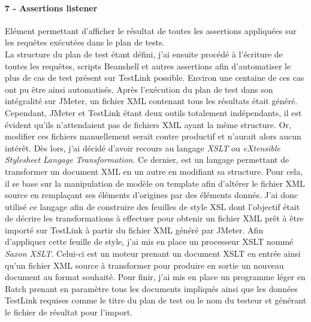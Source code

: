 	\paragraph{7 - Assertions listener}
	Elément permettant d'afficher le résultat de toutes les assertions appliquées sur les requêtes exécutées dans le plan de tests. \\
	
	La structure du plan de test étant défini, j'ai ensuite procédé à l'écriture de toutes les requêtes, scripts Beanshell et autres assertions afin d'automatiser le plus de cas de test présent sur TestLink possible. Environ une centaine de ces cas ont pu être ainsi automatisés. Après l'exécution du plan de test dans son intégralité sur JMeter, un fichier XML contenant tous les résultats était généré. \\
	
	 Cependant, JMeter et TestLink étant deux outils totalement indépendants, il est évident qu'ils n'attendaient pas de fichiers XML ayant la même structure. Or, modifier ces fichiers manuellement serait contre productif et n'aurait alors aucun intérêt. Dès lors, j'ai décidé d'avoir recours au langage \textit{XSLT} ou \textit{eXtensible Stylesheet Langage Transformation}. Ce dernier, est un langage permettant de transformer un document XML en un autre en modifiant sa structure. Pour cela, il se base sur la manipulation de modèle ou template afin d'altérer le fichier XML source en remplaçant ses éléments d'origines par des éléments donnés. J'ai donc utilisé ce langage afin de construire des feuilles de style XSL dont l'objectif était de décrire les transformations à effectuer pour obtenir un fichier XML prêt à être importé sur TestLink à partir du fichier XML généré par JMeter. Afin d'appliquer cette feuille de style, j'ai mis en place un processeur XSLT nommé \textit{Saxon XSLT}. Celui-ci est un moteur prenant un document XSLT en entrée ainsi qu'un fichier XML source à transformer pour produire en sortie un nouveau document au format souhaité. Pour finir, j'ai mis en place un programme léger en Batch prenant en paramètre tous les documents impliqués ainsi que les données TestLink requises comme le titre du plan de test ou le nom du testeur et générant le fichier de résultat pour l'import.